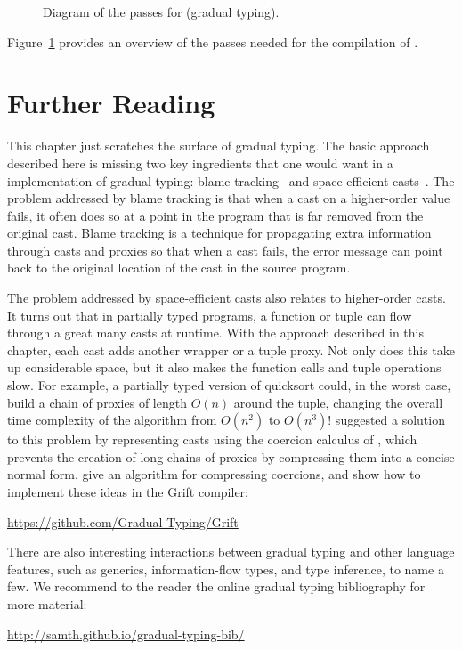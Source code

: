 \documentclass[7x10]{TimesAPriori_MIT}%
\numberwithin{theorem}{chapter}
\numberwithin{definition}{chapter}
\numberwithin{equation}{chapter}
\begin{document}
\begin{figure}[p]
\caption{Diagram of the passes for \LangGrad{} (gradual typing).}
\label{fig:Lgradual-passes}
\end{figure}

Figure~\ref{fig:Lgradual-passes} provides an overview of the passes
needed for the compilation of \LangGrad{}.

\section{Further Reading}

This chapter just scratches the surface of gradual typing.  The basic
approach described here is missing two key ingredients that one would
want in a implementation of gradual typing: blame
tracking~\citep{Tobin-Hochstadt:2006fk,Wadler:2009qv} and
space-efficient casts~\citep{Herman:2006uq,Herman:2010aa}.  The
problem addressed by blame tracking is that when a cast on a
higher-order value fails, it often does so at a point in the program
that is far removed from the original cast. Blame tracking is a
technique for propagating extra information through casts and proxies
so that when a cast fails, the error message can point back to the
original location of the cast in the source program.

The problem addressed by space-efficient casts also relates to
higher-order casts. It turns out that in partially typed programs, a
function or tuple can flow through a great many casts at runtime. With
the approach described in this chapter, each cast adds another
 wrapper or a tuple proxy. Not only does this take up
considerable space, but it also makes the function calls and tuple
operations slow.  For example, a partially typed version of quicksort
could, in the worst case, build a chain of proxies of length $O(n)$
around the tuple, changing the overall time complexity of the
algorithm from $O(n^2)$ to $O(n^3)$! \citet{Herman:2006uq} suggested a
solution to this problem by representing casts using the coercion
calculus of \citet{Henglein:1994nz}, which prevents the creation of
long chains of proxies by compressing them into a concise normal
form. \citet{Siek:2015ab} give an algorithm for compressing coercions,
and \citet{Kuhlenschmidt:2019aa} show how to implement these ideas in
the Grift compiler:
\begin{center}
  \url{https://github.com/Gradual-Typing/Grift}
\end{center}

There are also interesting interactions between gradual typing and
other language features, such as generics, information-flow types, and
type inference, to name a few. We recommend to the reader the
online gradual typing bibliography for more material:
\begin{center}
  \url{http://samth.github.io/gradual-typing-bib/}
\end{center}
\end{document}
